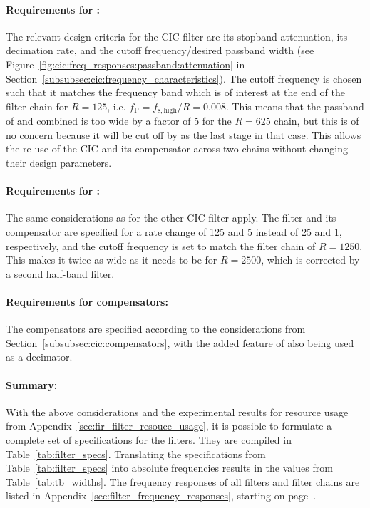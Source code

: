 \paragraph{Requirements     for     :} The     relevant     design
criteria    for   the    CIC    filter   are    its   stopband    attenuation,
its   decimation    rate,   and   the   cutoff    frequency/desired   passband
width    (see   Figure~\ref{fig:cic:freq_responses:passband:attenuation}    in
Section~\ref{subsubsec:cic:frequency_characteristics}).  The  cutoff frequency
is chosen such that it matches the  frequency band which is of interest at the
end of the filter chain  for $R=125$, i.e. $f_\mathrm{P} = f_\mathrm{s,high}/R
=  0.008$. This means  that  the passband  of   and  
combined is too wide by a factor of \num{5} for the $R=625$ chain, but this is
of no concern because it will be cut  off by  as the last stage in
that case. This  allows the re-use of  the CIC and its  compensator across two
chains without changing their design parameters.

\paragraph{Requirements for :} The same considerations as for the
other CIC  filter apply. The filter  and its  compensator are specified  for a
rate  change  of  \num{125}  and  \num{5} instead  of  \num{25}  and  \num{1},
respectively, and  the cutoff frequency  is set to  match the filter  chain of
$R=1250$. This makes it twice as wide as it needs to be for $R=2500$, which is
corrected by a second half-band filter.

\paragraph{Requirements  for  compensators:} The  compensators  are  specified
according to the considerations from Section~\ref{subsubsec:cic:compensators},
with the added feature of  also being used as a decimator.

\paragraph{Summary:} With  the  above   considerations  and  the  experimental
results for  resource usage  from Appendix~\ref{sec:fir_filter_resouce_usage},
it  is  possible  to  formulate  a complete  set  of  specifications  for  the
filters. They  are  compiled   in  Table~\ref{tab:filter_specs}.   Translating
the   specifications    from   Table~\ref{tab:filter_specs}    into   absolute
frequencies   results  in   the  values   from  Table~\ref{tab:tb_widths}. The
frequency    responses    of   all    filters    and    filter   chains    are
listed    in   Appendix~\ref{sec:filter_frequency_responses},    starting   on
page~\pageref{sec:filter_frequency_responses}.

